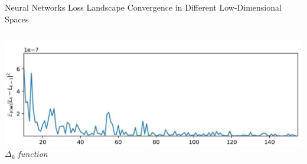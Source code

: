 \documentclass[10pt]{beamer}
\begin{document}
\begin{frame}{Neural Networks Loss Landscape Convergence in Different Low-Dimensional Spaces}
\begin{columns}[t]
        \centering
        \vspace*{-3.3cm}
        \hspace*{-2.2cm}
        \includegraphics[width=1.6\textwidth]{img/D_32.pdf}\\
        \hspace*{-1.2cm}
        \scriptsize \textit{$\Delta_k$ function}
    \end{columns}

\end{frame}
\end{document}

